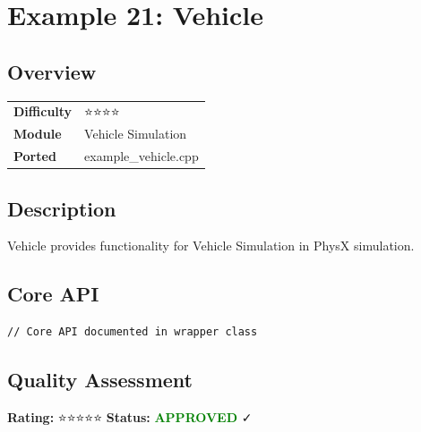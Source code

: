 \section{Example 21: Vehicle}
\subsection{Overview}
\begin{table}[h]
\centering
\begin{tabular}{|l|l|}
\hline
\textbf{Difficulty} & ⭐⭐⭐⭐ \\
\textbf{Module} & Vehicle Simulation \\
\textbf{Ported} & example\_vehicle.cpp \\
\hline
\end{tabular}
\end{table}

\subsection{Description}
Vehicle provides functionality for Vehicle Simulation in PhysX simulation.

\subsection{Core API}
\begin{lstlisting}
// Core API documented in wrapper class
\end{lstlisting}

\subsection{Quality Assessment}
\textbf{Rating:} ⭐⭐⭐⭐⭐ \quad \textbf{Status:} \textcolor{green}{\textbf{APPROVED}} ✓

